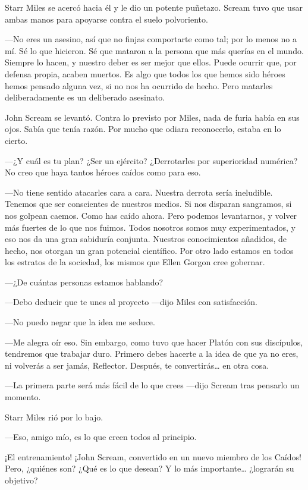 Starr Miles se acercó hacia él y le dio un potente puñetazo. Scream tuvo que usar ambas manos para apoyarse contra el suelo polvoriento.

---No eres un asesino, así que no finjas comportarte como tal; por lo menos no a mí. Sé lo que hicieron. Sé que mataron a la persona que más querías en el mundo. Siempre lo hacen, y nuestro deber es ser mejor que ellos. Puede ocurrir que, por defensa propia, acaben muertos. Es algo que todos los que hemos sido héroes hemos pensado alguna vez, si no nos ha ocurrido de hecho. Pero matarles deliberadamente es un deliberado asesinato.

John Scream se levantó. Contra lo previsto por Miles, nada de furia había en sus ojos. Sabía que tenía razón. Por mucho que odiara reconocerlo, estaba en lo cierto.

---¿Y cuál es tu plan? ¿Ser un ejército? ¿Derrotarles por superioridad numérica? No creo que haya tantos héroes caídos como para eso.

---No tiene sentido atacarles cara a cara. Nuestra derrota sería ineludible. Tenemos que ser conscientes de nuestros medios. Si nos disparan sangramos, si nos golpean caemos. Como has caído ahora. Pero podemos levantarnos, y volver más fuertes de lo que nos fuimos. Todos nosotros somos muy experimentados, y eso nos da una gran sabiduría conjunta. Nuestros conocimientos añadidos, de hecho, nos otorgan un gran potencial científico. Por otro lado estamos en todos los estratos de la sociedad, los mismos que Ellen Gorgon cree gobernar.

---¿De cuántas personas estamos hablando?

---Debo deducir que te unes al proyecto ---dijo Miles con satisfacción.

---No puedo negar que la idea me seduce.

---Me alegra oír eso. Sin embargo, como tuvo que hacer Platón con sus discípulos, tendremos que trabajar duro. Primero debes hacerte a la idea de que ya no eres, ni volverás a ser jamás, Reflector. Después, te convertirás\dots{} en otra cosa.

---La primera parte será más fácil de lo que crees ---dijo Scream tras pensarlo un momento.

Starr Miles rió por lo bajo.

---Eso, amigo mío, es lo que creen todos al principio.

\begin{next}
    ¡El entrenamiento! ¡John Scream, convertido en un nuevo miembro de los Caídos! Pero, ¿quiénes son? ¿Qué es lo que desean? Y lo más importante\dots{} ¿lograrán su objetivo?
\end{next}

\endinput
